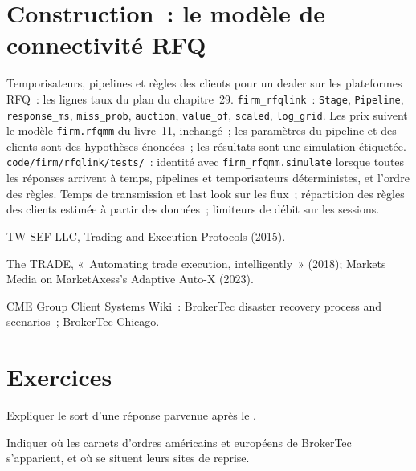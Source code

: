 \section{Construction~: le modèle de connectivité RFQ}\label{bld:nw:fixed-income-and-rfq-platform-connectivity:rfqlink}

\begin{build}
 Temporisateurs, pipelines et règles des clients pour un dealer sur les plateformes RFQ~: les lignes taux du plan du chapitre~29.
 \texttt{firm\_rfqlink}~: \texttt{Stage}, \texttt{Pipeline}, \texttt{response\_ms}, \texttt{miss\_prob},
\texttt{auction}, \texttt{value\_of}, \texttt{scaled}, \texttt{log\_grid}.
 Les prix suivent le modèle \texttt{firm.rfqmm} du livre~11, inchangé~; les paramètres du pipeline et des clients sont des hypothèses énoncées~;
les résultats sont une simulation étiquetée.
 \texttt{code/firm/rfqlink/tests/}~: identité avec \texttt{firm\_rfqmm.simulate} lorsque toutes les réponses arrivent à temps,
pipelines et temporisateurs déterministes, et l'ordre des règles.
 Temps de transmission et last look sur les flux~; répartition des règles des clients estimée à partir des données~; limiteurs de débit sur les sessions.
\end{build}

\begin{omsources}
\item TW SEF LLC, Trading and Execution Protocols (2015).
\item The TRADE, «~Automating trade execution, intelligently~» (2018); Markets Media on MarketAxess's Adaptive Auto-X (2023).
\item CME Group Client Systems Wiki~: BrokerTec disaster recovery process and scenarios~; BrokerTec Chicago.
\end{omsources}

\section{Exercices}

\begin{exercise}[$\star$]\label{exo:nw:fixed-income-and-rfq-platform-connectivity:1}
Expliquer le sort d'une réponse parvenue après le .
\end{exercise}

\begin{exercise}[$\star$]\label{exo:nw:fixed-income-and-rfq-platform-connectivity:2}
Indiquer où les carnets d'ordres américains et européens de BrokerTec s'apparient, et où se situent leurs sites de reprise.
\end{exercise}


